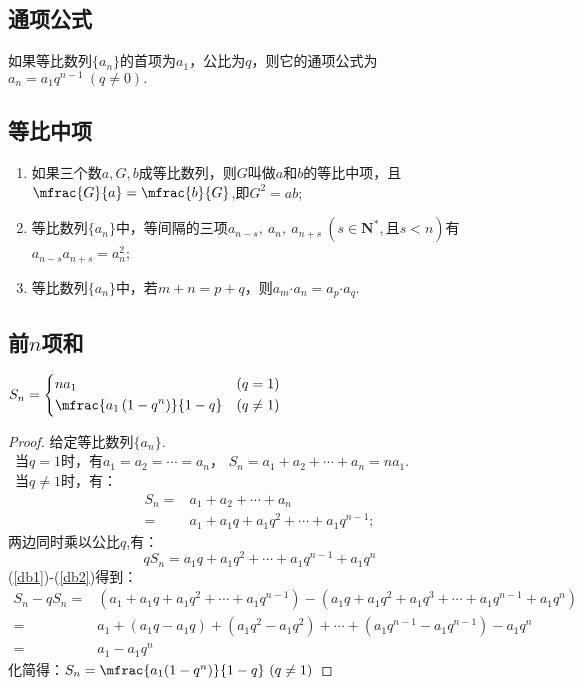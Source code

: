   \subsection{通项公式}如果等比数列$\{a_n\}$的首项为$a_1$，公比为$ q $，则它的通项公式为$ a_n=a_1q^{n-1}~(q\ne0). $
  \subsection{等比中项}
    \begin{enumerate}[(1)]
      \item 如果三个数$ a,G,b $成等比数列，则$ G $叫做$ a $和$ b $的等比中项，且$ \mfrac{G}{a}=\mfrac{b}{G} $,即$ G^2=ab $;
      \item 等比数列$ \{a_n\} $中，等间隔的三项$ a_{n-s},~a_n,~a_{n+s}~(s\in\mathbf{N^*},\text{且} s<n ) $有$ a_{n-s}a_{n+s}=a_n^2 $;
      \item 等比数列$ \{a_n\} $中，若$ m+n=p+q $，则$ a_m\bm{\cdot}a_n=a_p\bm{\cdot}a_q $.
    \end{enumerate}
  \subsection{前$ n $项和}
    $S_n=\Bigg\{\begin{aligned}
    &na_1&\left(q=1\right)\\
    &\mfrac{a_1\left(1-q^n\right)}{1-q}&\left(q\ne1\right)
    \end{aligned}$
    \begin{proof}
      给定等比数列$\{a_n\}$.\\
      ~当$ q=1$时，有$ a_1=a_2=\cdots=a_n $，
        $ S_n=a_1+a_2+\cdots+a_n=na_1. $\\
      ~当$ q\ne1 $时，有：
        \begin{equation}\label{db1}
          \begin{aligned}
            S_n=&a_1+a_2+\cdots+a_n \\
            =&a_1+a_1q+a_1q^2+\cdots+a_1q^{n-1};
          \end{aligned}
        \end{equation}
        两边同时乘以公比$q$,有：
        \begin{equation}\label{db2}
          qS_n=a_1q+a_1q^2+\cdots+a_1q^{n-1}+a_1q^n
        \end{equation}
        (\ref{db1})-(\ref{db2})得到：
        \begin{equation*}
          \begin{aligned}
            S_n-qS_n=&\left(a_1+a_1q+a_1q^2+\cdots+a_1q^{n-1}\right)-\left(a_1q+a_1q^2+a_1q^3+\cdots+a_1q^{n-1}+a_1q^n\right)\\
            =&a_1+\left(a_1q-a_1q\right)+\left(a_1q^2-a_1q^2\right)+\cdots+\left(a_1q^{n-1}-a_1q^{n-1}\right)-a_1q^n\\
            =&a_1-a_1q^n
          \end{aligned}
        \end{equation*}
        化简得：$ S_n=\mfrac{a_1(1-q^n)}{1-q}~(q\ne1) $
    \end{proof}
